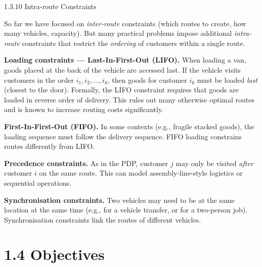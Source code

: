 \documentclass[aspectratio=169,10pt]{beamer}
\begin{document}
\begin{frame}[allowframebreaks]{1.3.10 Intra-route Constraints}

So far we have focused on \emph{inter-route} constraints (which routes to create,
how many vehicles, capacity).  But many practical problems impose additional
\emph{intra-route} constraints that restrict the \emph{ordering} of customers within
a single route.

\medskip
\textbf{Loading constraints --- Last-In-First-Out (LIFO).}
When loading a van, goods placed at the back of the vehicle are accessed last.
If the vehicle visits customers in the order $i_1, i_2, \ldots, i_k$, then goods
for customer $i_k$ must be loaded \emph{last} (closest to the door).  Formally,
the LIFO constraint requires that goods are loaded in reverse order of delivery.
This rules out many otherwise optimal routes and is known to increase routing costs
significantly.

\medskip
\textbf{First-In-First-Out (FIFO).}
In some contexts (e.g., fragile stacked goods), the loading sequence must follow the
delivery sequence.  FIFO loading constrains routes differently from LIFO.

\medskip
\textbf{Precedence constraints.}
As in the PDP, customer $j$ may only be visited \emph{after} customer $i$ on the
same route.  This can model assembly-line-style logistics or sequential operations.

\medskip
\textbf{Synchronisation constraints.}
Two vehicles may need to be at the same location at the same time (e.g., for a
vehicle transfer, or for a two-person job).  Synchronisation constraints link
the routes of different vehicles.

\end{frame}

\section{1.4 Objectives}
\end{document}
